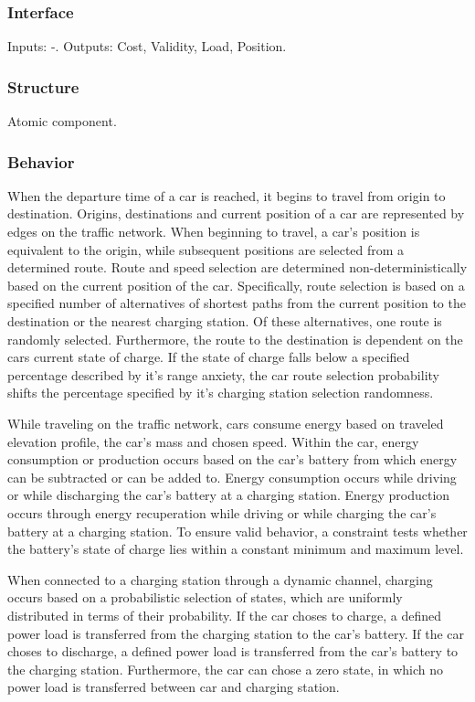 \subsubsection{Interface}

Inputs: -. Outputs: Cost, Validity, Load, Position.

\subsubsection{Structure}

Atomic component.

\subsubsection{Behavior}

When the departure time of a car is reached, it begins to travel from origin to destination. Origins, destinations and current position of a car are represented by edges on the traffic network.  When beginning to travel, a car's position is equivalent to the origin, while subsequent positions are selected from a determined route. Route and speed selection are determined non-deterministically based on the current position of the car. Specifically, route selection is based on a specified number of alternatives of shortest paths from the current position to the destination or the nearest charging station. Of these alternatives, one route is randomly selected. Furthermore, the route to the destination is dependent on the cars current state of charge. If the state of charge falls below a specified percentage described by it's range anxiety, the car route selection probability shifts the percentage specified by it's charging station selection randomness.

While traveling on the traffic network, cars consume energy based on traveled elevation profile, the car's mass and chosen speed. Within the car, energy consumption or production occurs based on the car's battery from which energy can be subtracted or can be added to. Energy consumption occurs while driving or while discharging the car's battery at a charging station. Energy production occurs through energy recuperation while driving or while charging the car's battery at a charging station. To ensure valid behavior, a constraint tests whether the battery's state of charge lies within a constant minimum and maximum level.
	
When connected to a charging station through a dynamic channel, charging occurs based on a probabilistic selection of states, which are uniformly distributed in terms of their probability. If the car choses to charge, a defined power load is transferred from the charging station to the car's battery. If the car choses to discharge, a defined power load is transferred from the car's battery to the charging station. Furthermore, the car can chose a zero state, in which no power load is transferred between car and charging station.
	
